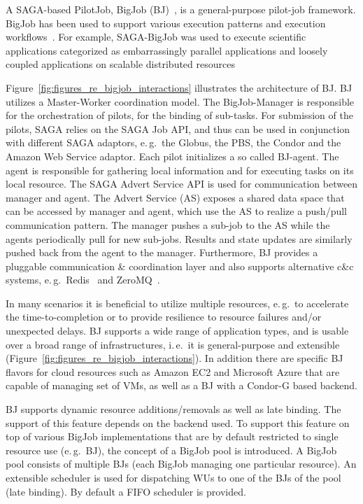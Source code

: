 \documentclass{sig-alternate}
\begin{document}
A SAGA-based PilotJob, BigJob
(BJ)~\cite{bigjob_web,saga_bigjob_condor_cloud}, is a general-purpose
pilot-job framework. BigJob has been used to support various execution
patterns and execution workflows~\cite{async_repex11,saga-royalsoc}.
For example, SAGA-BigJob was used to execute scientific applications
categorized as embarrassingly parallel applications and loosely coupled
applications on scalable distributed resources~\cite{ecmls_ccpe10,
  dare-ecmls11}

Figure~\ref{fig:figures_re_bigjob_interactions} illustrates the
architecture of BJ. BJ utilizes a Master-Worker coordination
model. The BigJob-Manager is responsible for the orchestration of
pilots, for the binding of sub-tasks. For submission of the pilots,
SAGA relies on the SAGA Job API, and thus can be used in conjunction
with different SAGA adaptors, e.\,g.\ the Globus, the PBS, the Condor
and the Amazon Web Service adaptor. Each pilot initializes a so called
BJ-agent. The agent is responsible for gathering local information and
for executing tasks on its local resource. The SAGA Advert Service API
is used for communication between manager and agent. The Advert
Service (AS) exposes a shared data space that can be accessed by
manager and agent, which use the AS to realize a push/pull
communication pattern.  The manager pushes a sub-job to the AS while
the agents periodically pull for new sub-jobs. Results and state
updates are similarly pushed back from the agent to the
manager. Furthermore, BJ provides a pluggable communication \&
coordination layer and also supports alternative c\&c systems,
e.\,g.\ Redis~\cite{redis} and ZeroMQ~\cite{zmq}.

In many scenarios it is beneficial to utilize multiple resources,
e.\,g.\ to accelerate the time-to-completion or to provide resilience
to resource failures and/or unexpected delays.  BJ supports a wide
range of application types, and is usable over a broad range of
infrastructures, i.\,e.\ it is general-purpose and extensible
(Figure~\ref{fig:figures_re_bigjob_interactions}). In addition there
are specific BJ flavors for cloud resources such as Amazon EC2 and
Microsoft Azure that are capable of managing set of VMs, as well as a
BJ with a Condor-G based backend.

BJ supports dynamic resource additions/removals as well as late
binding. The support of this feature depends on the backend used. To
support this feature on top of various BigJob implementations that are
by default restricted to single resource use (e.\,g.\ BJ), the concept
of a BigJob pool is introduced. A BigJob pool consists of multiple BJs
(each BigJob managing one particular resource). An extensible
scheduler is used for dispatching WUs to one of the BJs of the pool
(late binding). By default a FIFO scheduler is provided.
\end{document}
